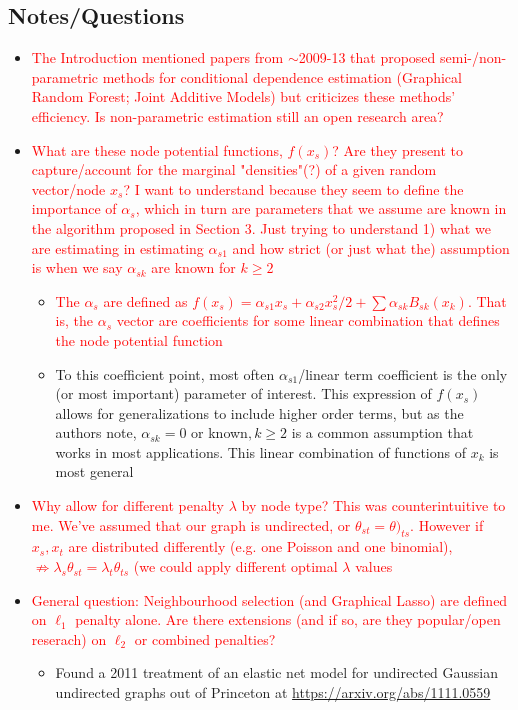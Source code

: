 \documentclass[11pt]{article}
\begin{document}
\subsection*{Notes/Questions}
	
	\begin{itemize}
	
		\item \textcolor{red}{The Introduction mentioned papers from \(\sim\)2009-13 that proposed semi-/non-parametric methods for conditional dependence estimation (Graphical Random Forest; Joint Additive Models) but criticizes these methods' efficiency. Is non-parametric estimation still an open research area?}
		
		\item \textcolor{red}{What are these node potential functions, $f(x_s)$? Are they present to capture/account for the marginal "densities"(?) of a given random vector/node $x_s$? I want to understand because they seem to define the importance of $\alpha_s$, which in turn are parameters that we assume are known in the algorithm proposed in Section 3. Just trying to understand 1) what we are estimating in estimating $\alpha_{s1}$ and how strict (or just what the) assumption is when we say $\alpha_{sk}$ are known for $k\geq 2$}
		\begin{itemize}
            \item \textcolor{red}{The $\alpha_s$ are defined as $f(x_s) = \alpha_{s1}x_s + \alpha_{s2}x_s^2/2 + \sum \alpha_{sk}B_{sk}(x_k)$. That is, the $\alpha_s$ vector are coefficients for some linear combination that defines the node potential function}
            \item To this coefficient point, most often $\alpha_{s1}$/linear term coefficient is the only (or most important) parameter of interest. This expression of $f(x_s)$ allows for generalizations to include higher order terms, but as the authors note, $\alpha_{sk}=0$ or known$, k\geq 2$ is a common assumption that works in most applications. This linear combination of functions of $x_k$ is most general 
        \end{itemize}

		\item \textcolor{red}{Why allow for different penalty $\lambda$ by node type? This was counterintuitive to me. We've assumed that our graph is undirected, or $\theta_{st}=\theta)_{ts}$. However if $x_s, x_t$ are distributed differently (e.g. one Poisson and one binomial), $\not \Rightarrow \lambda_s \theta_{st}= \lambda_t \theta_{ts}$ (we could apply different optimal $\lambda$ values}
		
		\item \textcolor{red}{General question: Neighbourhood selection (and Graphical Lasso) are defined on $\ell_1$ penalty alone. Are there extensions (and if so, are they popular/open reserach) on $\ell_2$ or combined penalties?}
			\begin{itemize}
                \item Found a 2011 treatment of an elastic net model for undirected Gaussian undirected graphs out of Princeton at \url{https://arxiv.org/abs/1111.0559}
            \end{itemize} 			
	\end{itemize}
	
\end{document}
